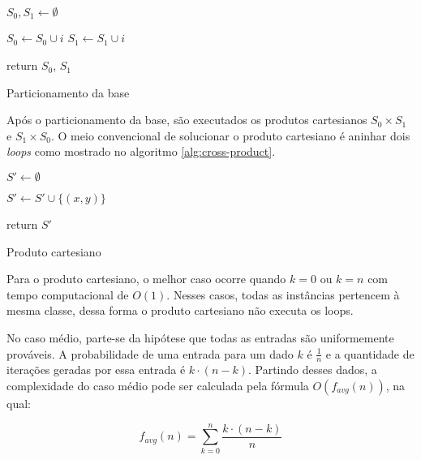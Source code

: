 \begin{algorithm}
    \begin{algorithmic}
        \STATE $S_0, S_1 \gets \emptyset$

                \STATE $S_0 \gets S_0 \cup {i}$
            \ELSE
                \STATE $S_1 \gets S_1 \cup {i}$
            \ENDIF
        \ENDFOR
        
        \STATE return $S_0$, $S_1$

        \caption{Particionamento da base}
        \label{alg:partition}
    \end{algorithmic}
\end{algorithm}

Após o particionamento da base, são executados os produtos cartesianos $S_0 \times S_1$ e $S_1 \times S_0$. O meio convencional de solucionar o produto cartesiano é aninhar dois \emph{loops} como mostrado no algoritmo \ref{alg:cross-product}.

\begin{algorithm}
    \begin{algorithmic}
        \STATE $S' \gets \emptyset$

                    \STATE $S' \gets S' \cup \{(x, y)\}$
                \ENDFOR
            \ENDFOR
        \ENDIF

        \STATE return $S'$

        \caption{Produto cartesiano}
        \label{alg:cross-product}

    \end{algorithmic}
\end{algorithm}

Para o produto cartesiano, o melhor caso ocorre quando $k = 0$ ou $k = n$ com tempo computacional de $O(1)$. Nesses casos, todas as instâncias pertencem à mesma classe, dessa forma o produto cartesiano não executa os loops.

No caso médio, parte-se da hipótese que todas as entradas são uniformemente prováveis. A probabilidade de uma entrada para um dado $k$ é $\frac{1}{n}$ e a quantidade de iterações geradas por essa entrada é $k \cdot (n - k)$. Partindo desses dados, a complexidade do caso médio pode ser calculada pela fórmula $O(f_{avg}(n))$, na qual:

\[f_{avg}(n) = \sum_{k = 0}^{n} \frac{k \cdot (n - k)}{n}\]

